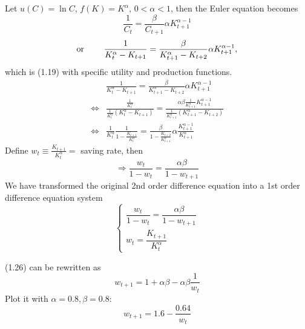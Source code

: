 \documentclass[twoside]{article}
\begin{document}
\begin{example}
  Let $u(C) = \ln C$, $f(K) = K^\alpha$, $0< \alpha <1$, then the Euler equation becomes  
  \begin{equation}
    \frac{1}{C_t} = \frac{\beta}{C_{t+1}}\alpha K_{t+1}^{\alpha-1}
  \end{equation}
  \begin{equation}
    \text{or \qquad} \frac{1}{K_{t}^\alpha - K_{t+1}} = \frac{\beta}{K_{t+1}^\alpha - K_{t+2}}\alpha K_{t+1}^{\alpha-1},
  \end{equation}
  which is (1.19) with specific utility and production functions.
  \begin{equation}
  \begin{aligned}
    & \frac{1}{ K_{t}^\alpha - K_{t+1} } = \frac{\beta}{K_{t+1}^\alpha - K_{t+2}}\alpha K_{t+1}^{\alpha-1}\\
    \iff & \frac{ \frac{1}{K_{t}^\alpha} }{\frac{1}{K_{t}^\alpha}(K_{t}^\alpha - K_{t+1})} = \frac{\alpha \beta \frac{1}{K_{t+1}^\alpha} K_{t+1}^{\alpha-1} }{\frac{1}{K_{t+1}^\alpha}(K_{t+1}^\alpha - K_{t+2})} \\
    \iff & \frac{ 1 }{{K_{t}^\alpha}} \frac{1}{1- \frac{K_{t+1}}{K_t^\alpha} } = \frac{\beta}{1- \frac{K_{t+2}}{K_{t+1}^\alpha}} \alpha \frac{K_{t+1}^{\alpha-1}}{K_{t+1}^\alpha}
  \end{aligned}
  \end{equation}
  Define $w_t \equiv \frac{K_{t+1}}{K_t^\alpha} = $ saving rate, then
  \begin{equation}
    \Longrightarrow \frac{w_t}{1- w_t } = \frac{\alpha \beta}{1- w_{t+1}}  
  \end{equation}
  We have transformed the original 2nd order difference equation into a 1st order difference equation system
  \begin{equation}
  \begin{cases}
    \dfrac{w_t}{1- w_t } = \dfrac{\alpha \beta}{1- w_{t+1}} \\
    w_t = \dfrac{K_{t+1}}{K_t^\alpha}
  \end{cases}
  \end{equation}

(1.26) can be rewritten as 
\begin{equation}
  w_{t+1} = 1 + \alpha \beta - \alpha \beta \frac{1}{w_t}
\end{equation}
Plot it with $\alpha = 0.8, \beta = 0.8$:
\begin{equation}
  w_{t+1} = 1.6 - \frac{0.64}{w_t}
\end{equation}


\end{example}
\end{document}
